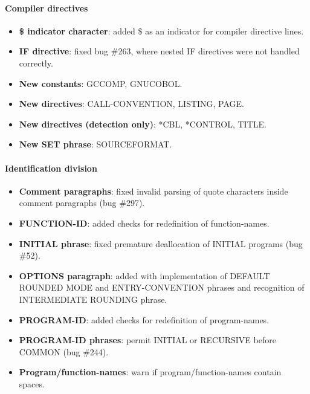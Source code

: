 \paragraph{Compiler directives}
\begin{itemize}
\item \textbf{\$ indicator character}: added \$ as an indicator for compiler directive lines.
\item \textbf{\directiveindicator{}IF directive}: fixed bug \#263, where nested \directiveindicator{}IF directives were not handled correctly.
\item \textbf{New constants}: GCCOMP, GNUCOBOL.
\item \textbf{New directives}: \directiveindicator{}CALL-CONVENTION, \directiveindicator{}LISTING, \directiveindicator{}PAGE.
\item \textbf{New directives (detection only)}: *CBL, *CONTROL, TITLE.
\item \textbf{New \directiveindicator{}SET phrase}: SOURCEFORMAT.
\end{itemize}

\paragraph{Identification division}
\begin{itemize}
\item \textbf{Comment paragraphs}: fixed invalid parsing of quote characters inside comment paragraphs (bug \#297).
\item \textbf{FUNCTION-ID}: added checks for redefinition of function-names.
\item \textbf{INITIAL phrase}: fixed premature deallocation of INITIAL programs (bug \#52).
\item \textbf{OPTIONS paragraph}: added with implementation of DEFAULT ROUNDED MODE and ENTRY-CONVENTION phrases and recognition of INTERMEDIATE ROUNDING phrase.
\item \textbf{PROGRAM-ID}: added checks for redefinition of program-names.
\item \textbf{PROGRAM-ID phrases}: permit INITIAL or RECURSIVE before COMMON (bug \#244).
\item \textbf{Program\slash{}function-names}: warn if program\slash{}function-names contain spaces.
\end{itemize}

